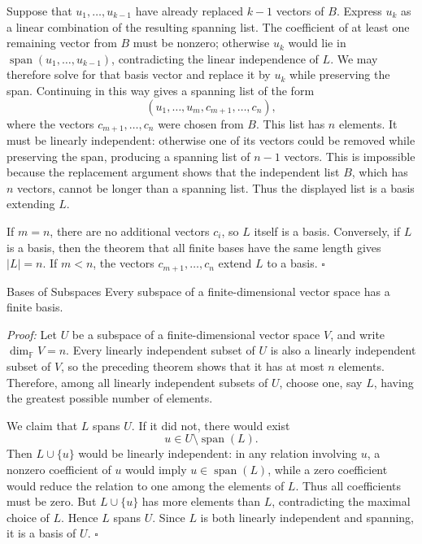 \documentclass[a4paper,11pt,abstract=true]{scrartcl}
\theoremstyle{dotlessP}
\theoremstyle{dotlessS}
\theoremstyle{remark}
\theoremstyle{definition}
\begin{document}
Suppose that $u_1,\ldots,u_{k-1}$ have already replaced $k-1$ vectors of
$B$. Express $u_k$ as a linear combination of the resulting spanning list.
The coefficient of at least one remaining vector from $B$ must be nonzero;
otherwise $u_k$ would lie in
$\operatorname{span}(u_1,\ldots,u_{k-1})$, contradicting the linear
independence of $L$. We may therefore solve for that basis vector and replace
it by $u_k$ while preserving the span. Continuing in this way gives a
spanning list of the form
\[
(u_1,\ldots,u_m,c_{m+1},\ldots,c_n),
\]
where the vectors $c_{m+1},\ldots,c_n$ were chosen from $B$. This list has
$n$ elements. It must be linearly independent: otherwise one of its vectors
could be removed while preserving the span, producing a spanning list of
$n-1$ vectors. This is impossible because the replacement argument shows
that the independent list $B$, which has $n$ vectors, cannot be longer than
a spanning list. Thus the displayed list is a basis extending $L$.

If $m=n$, there are no additional vectors $c_i$, so $L$ itself is a basis.
Conversely, if $L$ is a basis, then the theorem that all finite bases have the
same length gives $|L|=n$. If $m<n$, the vectors
$c_{m+1},\ldots,c_n$ extend $L$ to a basis. \hfill$\square$

\begin{mainbox}{Bases of Subspaces} 
Every subspace of a
finite-dimensional vector space has a finite basis.
\end{mainbox}

\textit{Proof:} Let $U$ be a subspace of a finite-dimensional vector space
$V$, and write $\dim_{\mathbb{F}} V=n$. Every linearly independent subset of $U$ is also
a linearly independent subset of $V$, so the preceding theorem shows that it
has at most $n$ elements. Therefore, among all linearly independent subsets
of $U$, choose one, say $L$, having the greatest possible number of elements.

We claim that $L$ spans $U$. If it did not, there would exist
\[
u\in U\setminus\operatorname{span}(L).
\]
Then $L\cup\{u\}$ would be linearly independent: in any relation involving
$u$, a nonzero coefficient of $u$ would imply
$u\in\operatorname{span}(L)$, while a zero coefficient would reduce the
relation to one among the elements of $L$. Thus all coefficients must be
zero. But $L\cup\{u\}$ has more elements than $L$, contradicting the maximal
choice of $L$. Hence $L$ spans $U$. Since $L$ is both linearly independent
and spanning, it is a basis of $U$. \hfill$\square$
\end{document}
